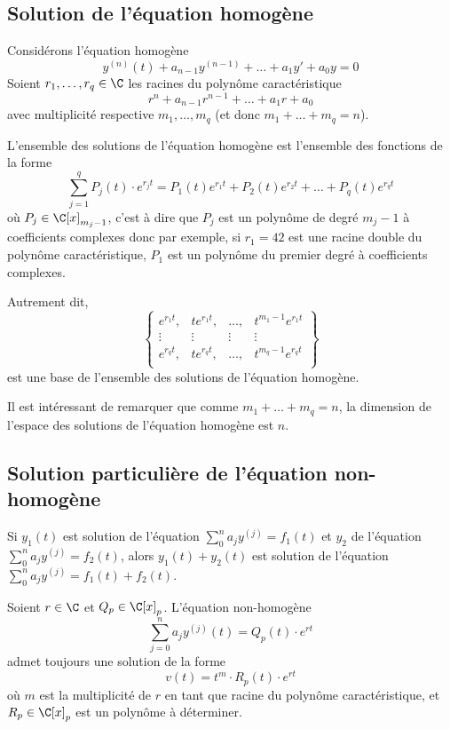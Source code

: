 \subsection{Solution de l'équation homogène}
\begin{mytheo}
	Considérons l'équation homogène
	\[ y^{(n)}(t) + a_{n-1}y^{(n-1)} + \dots + a_1y' + a_0y = 0 \]
	Soient $r_1, \dots, r_q \in \C$ les racines du polynôme caractéristique
	\[ r^n + a_{n-1}r^{n-1} + \dots + a_1r + a_0 \]
	avec multiplicité respective $m_1, \dots, m_q$ (et donc $m_1 + \dots + m_q = n$).

	L'ensemble des solutions de l'équation homogène est l'ensemble des fonctions de la forme
    \[ \sum_{j=1}^{q} P_j(t) \cdot e^{r_j t} =
    P_1(t)e^{r_1 t} + P_2(t)e^{r_2 t} + \ldots + P_q(t)e^{r_q t} \]
	où $P_j \in \C[x]_{m_j -1}$, c'est à dire que $P_j$ est un polynôme
    de degré $m_j-1$ à coefficients complexes donc par exemple,
    si $r_1=42$ est une racine double du polynôme caractéristique,
    $P_1$ est un polynôme du premier degré à coefficients complexes.

	Autrement dit,
	\[ \begin{Bmatrix}
		e^{r_1t}, & te^{r_1t}, & \dots, & t^{m_1-1}e^{r_1t}\\
		\vdots & \vdots & \vdots & \vdots\\
		e^{r_qt}, & te^{r_qt}, & \dots, & t^{m_q-1}e^{r_qt}\\
	\end{Bmatrix} \]
	est une base de l'ensemble des solutions de l'équation homogène.

	Il est intéressant de remarquer que comme $m_1 + \dots + m_q = n$,
	la dimension de l'espace des solutions de l'équation homogène est $n$.
\end{mytheo}

\subsection{Solution particulière de l'équation non-homogène}
\begin{myprop}
	Si $y_1(t)$ est solution de l'équation $\sum_0^n a_j y^{(j)} = f_1(t)$ et $y_2$ de l'équation $\sum_0^n a_j y^{(j)} = f_2(t)$,
	alors $y_1(t) + y_2(t)$ est solution de l'équation $\sum_0^n a_j y^{(j)} = f_1(t) + f_2(t)$.
\end{myprop}

\begin{myprop}
	\label{prop:part}
	Soient $r \in \C$ et $Q_p \in \C[x]_p$.
	L'équation non-homogène
	\[ \sum_{j=0}^n a_j y^{(j)}(t) = Q_p(t) \cdot e^{rt} \]
	admet toujours une solution de la forme
	\[ v(t) = t^m \cdot R_p(t) \cdot e^{rt} \]
	où $m$ est la multiplicité de $r$ en tant que racine du polynôme caractéristique,
	et $R_p \in \C[x]_p$ est un polynôme à déterminer.
\end{myprop}

